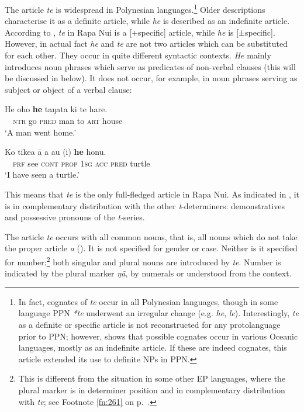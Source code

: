 The article \textit{te} is widespread in Polynesian languages.\footnote{\label{fn:249}In fact, cognates of \textit{te} occur in all Polynesian languages, though in some language PPN \textit{*te} underwent an irregular change (e.g.  \textit{he},  \textit{le}). Interestingly, \textit{te} as a definite or specific article is not reconstructed for any protolanguage prior to PPN; however, \citet{Clark2015} shows that possible cognates occur in various Oceanic languages, mostly as an indefinite article. If these are indeed cognates, this article extended its use to definite NPs in PPN.} Older descriptions characterise it as a definite article, while \textit{he} is described as an indefinite article. According to \citet[11]{DuFeu1996}, \textit{te} in Rapa Nui is a [+specific] article, while \textit{he} is [±specific]. However, in actual fact \textit{he} and \textit{te} are not two articles which can be substituted for each other. They occur in quite different syntactic contexts. \textit{He} mainly introduces noun phrases which serve as predicates of non-verbal clauses (this will be discussed in  below). It does not occur, for example, in noun phrases serving as subject or object of a verbal clause:

\ea\label{ex:5.26}
\gll *He oho \textbf{he} taŋata ki te hare. \\
\textsc{~~ntr} go \textsc{pred} man to \textsc{art} house \\

\glt 
‘A man went home.’
\z

\ea\label{ex:5.27}
\gll *Ko tike{\ꞌ}a {\ꞌ}ā a au (i) \textbf{he} honu. \\
\textsc{~~prf} see \textsc{cont} \textsc{prop} \textsc{1sg} \textsc{acc} \textsc{pred} turtle \\

\glt
‘I have seen a turtle.’
\z

This means that \textit{te} is the only full-fledged article in Rapa Nui. As indicated in , it is in complementary distribution with the other \textit{t}{}-determiners: demonstratives and possessive pronouns of the \textit{t-}series. 

The article \textit{te} occurs with all common nouns, that is, all nouns which do not take the proper article \textit{a} (). It is not specified for gender or case. Neither is it specified for number:\footnote{\label{fn:250}This is different from the situation in some other EP languages, where the plural marker is in determiner position and in complementary distribution with \textit{te}; see Footnote \ref{fn:261} on p.~\pageref{fn:261}.} both singular and plural nouns are introduced by \textit{te}. Number is indicated by the plural marker \textit{ŋā}, by numerals or understood from the context.

